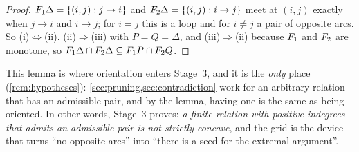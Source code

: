 \begin{proof}
$F_1\Delta=\{(i,j):j\to i\}$ and $F_2\Delta=\{(i,j):i\to j\}$ meet at $(i,j)$
exactly when $j\to i$ and $i\to j$; for $i=j$ this is a loop and for $i\ne j$
a pair of opposite arcs. So (i)$\Leftrightarrow$(ii). (ii)$\Rightarrow$(iii)
with $P=Q=\Delta$, and (iii)$\Rightarrow$(ii) because $F_1$ and $F_2$ are
monotone, so $F_1\Delta\cap F_2\Delta\subseteq F_1 P\cap F_2 Q$.
\end{proof}

This lemma is where orientation enters Stage~3, and it is the \emph{only}
place (\cref{rem:hypotheses}): \cref{sec:pruning,sec:contradiction} work
for an arbitrary relation that has an admissible pair, and by the lemma,
having one is the same as being oriented. In other words, Stage~3 proves:
\emph{a finite relation with positive indegrees that admits an admissible
pair is not strictly concave}, and the grid is the device that turns ``no
opposite arcs'' into ``there is a seed for the extremal argument''.

